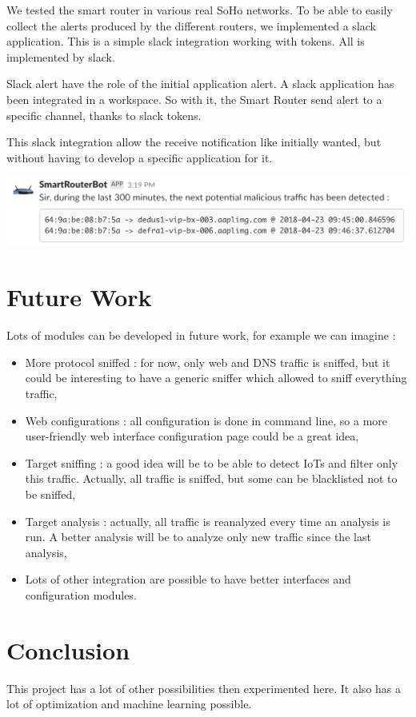 \begin{frame}{}
\begin{multicols}{3}
We tested the smart router in various real SoHo networks. To be able to easily collect the alerts produced by the different routers, we implemented a slack application. This is a simple slack integration working with tokens. All is implemented by slack.

Slack alert have the role of the initial application alert. A slack application has been integrated in a workspace. So with it, the Smart Router send alert to a specific channel, thanks to slack tokens. 

This slack integration allow the receive notification like initially wanted, but without having to develop a specific application for it.

\includegraphics[width=\linewidth]{Pictures/slack.png}

\section{Future Work}
Lots of modules can be developed in future work, for example we can imagine : 
\begin{itemize}
	\item More protocol sniffed : for now, only web and DNS traffic is sniffed, but it could be interesting to have a generic sniffer which allowed to sniff everything traffic,
	
	\item Web configurations : all configuration is done in command line, so a more user-friendly web interface configuration page could be a great idea,
	
	\item Target sniffing : a good idea will be to be able to detect IoTs and filter only this traffic. Actually, all traffic is sniffed, but some can be blacklisted not to be sniffed,

	\item Target analysis : actually, all traffic is reanalyzed every time an analysis is run. A better analysis will be to analyze only new traffic since the last analysis,

	\item Lots of other integration are possible to have better interfaces and configuration modules.
\end{itemize}


\section{Conclusion}
This project has a lot of other possibilities then experimented here. It also has a lot of optimization and machine learning possible. 

\end{multicols}
\end{frame}













